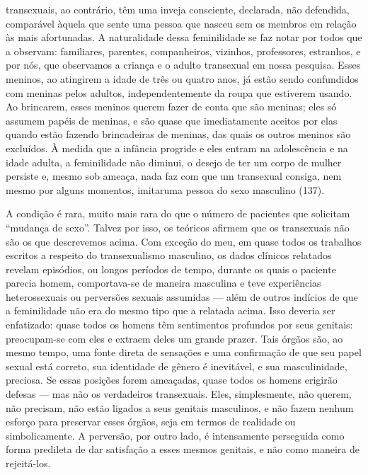 transexuais, ao contrário, têm uma inveja consciente, declarada, não
defendida, comparável àquela que sente uma pessoa que nasceu sem os
membros em relação às mais afortunadas. A naturalidade dessa
feminilidade se faz notar por todos que a observam: familiares,
parentes, companheiros, vizinhos, professores, estranhos, e por nós,
que observamos a criança e o adulto transexual em nossa pesquisa. Esses
meninos, ao atingirem a idade de três ou quatro anos, já estão
sendo confundidos com meninas pelos adultos, independentemente da
roupa que estiverem usando. Ao brincarem, esses meninos querem fazer de
conta que são meninas; eles só assumem papéis de meninas, e são quase
que imediatamente aceitos por elas quando estão fazendo brincadeiras de
meninas, das quais os outros meninos são excluídos. À medida que a infância
progride e eles entram na adolescência e na idade adulta, a
feminilidade não diminui, o desejo de ter um corpo de mulher persiste
e, mesmo sob ameaça, nada faz com que um transexual consiga, nem mesmo
por alguns momentos, imitar\idxidenefe[|)] uma pessoa do sexo masculino (137).

A condição é rara, muito mais rara do que o número de pacientes que
solicitam ``mudança de sexo''. Talvez por
isso, os teóricos afirmem que os transexuais\idxgenetgenitran{} não são os que descrevemos
acima. Com exceção do meu, em quase todos os trabalhos escritos a
respeito do transexualismo masculino, os dados clínicos relatados
revelam episódios, ou longos períodos de tempo, durante os quais o
paciente parecia homem, comportava-se de maneira masculina e teve
experiências heterossexuais ou perversões sexuais assumidas --- além
de outros indícios de que a feminilidade não era do mesmo tipo que a
relatada acima. Isso deveria ser enfatizado: quase todos os homens têm
 sentimentos profundos por seus genitais:\idxtransegeni{} preocupam-se com eles e
extraem deles um grande prazer. Tais órgãos são, ao mesmo tempo, uma
fonte direta de sensações e uma confirmação de que seu papel sexual
está correto, sua identidade de gênero é inevitável, e sua
masculinidade, preciosa. Se essas posições forem ameaçadas, quase todos
os homens erigirão defesas --- mas não os verdadeiros transexuais.
Eles, simplesmente, não querem, não precisam, não estão ligados a seus
genitais masculinos, e não fazem nenhum esforço para preservar esses
órgãos, seja em termos de realidade ou simbolicamente. A perversão, por
outro lado, é intensamente perseguida como forma predileta de dar
satisfação a esses mesmos genitais, e não como maneira de rejeitá-los.


